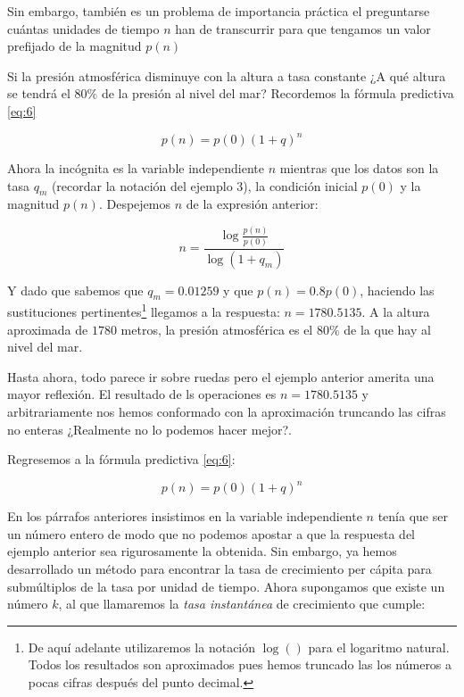 Sin embargo, también es un problema de importancia práctica el preguntarse cuántas unidades de tiempo $n$ han de transcurrir para que tengamos un valor prefijado de la magnitud $p(n)$

\begin{ejemplo}

Si la presión atmosférica disminuye con la altura a tasa constante ¿A qué altura se tendrá el $80\%$ de la presión al nivel del mar?
Recordemos la fórmula predictiva \ref{eq:6}

 \begin{equation*} 
 p(n)=p(0)(1+q)^n
\end{equation*}

Ahora la incógnita es la variable independiente $n$ mientras que los datos son la tasa $q_m$ (recordar la notación del ejemplo 3), la condición inicial $p(0)$ y la magnitud $p(n)$. Despejemos $n$ de la expresión anterior:

\[
n=\dfrac{\log\frac{p(n)}{p(0)}}{\log(1+q_m)}
\]

Y dado que sabemos que $q_m=0.01259$ y que $p(n)=0.8p(0)$, haciendo las sustituciones pertinentes\footnote{De aquí adelante utilizaremos la notación $\log()$ para el logaritmo natural. Todos los resultados son aproximados pues hemos truncado las los números a pocas cifras después del punto decimal.} llegamos a la respuesta: $n=1780.5135$. A la altura aproximada de $1780$ metros, la presión atmosférica es el $80\%$ de la que hay al nivel del mar.

\end{ejemplo}

Hasta ahora, todo parece ir sobre ruedas pero el ejemplo anterior amerita una mayor reflexión. El resultado de ls operaciones es $n=1780.5135$ y arbitrariamente nos hemos conformado con la aproximación truncando las cifras no enteras ¿Realmente no lo podemos hacer mejor?. 

Regresemos a la fórmula predictiva \ref{eq:6}: 

\[
p(n)=p(0)(1+q)^n
\]

En los párrafos anteriores insistimos en la variable independiente $n$ tenía que ser un número entero de modo que no podemos apostar a que la respuesta del ejemplo anterior sea rigurosamente la obtenida. Sin embargo, ya hemos desarrollado un método para encontrar la tasa de crecimiento per cápita para submúltiplos de la tasa por unidad de tiempo. Ahora supongamos que existe un número $k$, al que llamaremos la \emph{tasa instantánea} de crecimiento que cumple:

